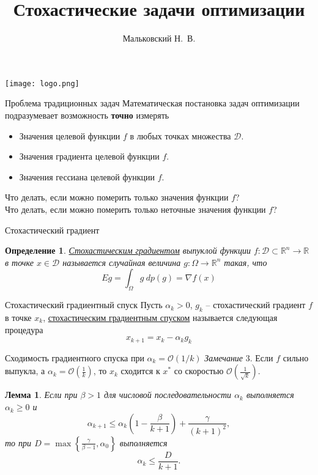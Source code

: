 \documentclass[10pt, handout]{beamer}
\author{Мальковский Н.~В.}
\title[Стохастические задачи]{Стохастические задачи оптимизации}
\institute[СПбАУ]{Санкт-Петербургский академический университет}
\date{}
\newcounter{lm}
\newcounter{def}
\newtheorem{lemma_ru}[lm]{Лемма}
\newtheorem{definition_ru}{Определение}[def]
\begin{document}
\begin{frame}
\titlepage
\centering
\texttt{[image: logo.png]}
\end{frame}

\begin{frame}{Проблема традиционных задач}
Математическая постановка задач оптимизации подразумевает возможность \textbf{точно} измерять
\pause
\begin{itemize}[<+->]
\item Значения целевой функции $f$ в любых точках множества $\mathcal{D}$.
\item Значения градиента целевой функции $f$.
\item Значения гессиана целевой функции $f$.
\end{itemize}
\pause
Что делать, если можно померить только значения функции $f$?\\
\vspace{1em}
Что делать, если можно померить только неточные значения функции $f$?
\end{frame}

\begin{frame}{Стохастический градиент}
\begin{definition_ru}
\underline{Стохастическим градиентом} выпуклой функции $f:\mathcal{D}\subset\mathbb{R}^n\rightarrow \mathbb{R}$ в точке $x\in \mathcal{D}$ называется 
случайная величина $g:\Omega\rightarrow \mathbb{R}^n$ такая, что
$$
Eg=\int_\Omega g~dp(g)= \nabla f(x)
$$
\end{definition_ru}

\end{frame}

\begin{frame}{Стохастический градиентный спуск}
Пусть $\alpha_k>0$, $g_k$ -- стохастический градиент $f$ в точке $x_k$, \underline{стохастическим градиентным спуском} называется следующая процедура
\begin{equation}\label{stochastic_gradient_descent}
x_{k+1}=x_k-\alpha_kg_k
\end{equation}

\end{frame}

\begin{frame}{Сходимость градиентного спуска при $\alpha_k=\mathcal{O}(1/k)$}
\textit{Замечание} 3. Если $f$ сильно выпукла, а $\alpha_k=\mathcal{O}(\frac{1}{k})$, то $x_k$ сходится к $x^*$ со скоростью $\mathcal{O}\left(\frac{1}{\sqrt{k}}\right)$.\\
\pause
\begin{lemma_ru}
Если при $\beta>1$ для числовой последовательности $\alpha_k$ выполняется $\alpha_k\geq 0$ и 
$$
\alpha_{k+1}\leq \alpha_k\left(1-\frac{\beta}{k+1}\right)+\frac{\gamma}{(k+1)^2},
$$
то при $D=\max\left\{\frac{\gamma}{\beta - 1}, \alpha_0\right\}$ выполняется
$$
\alpha_k\leq \frac{D}{k+1}.
$$
\end{lemma_ru}
\end{frame}
\end{document}
